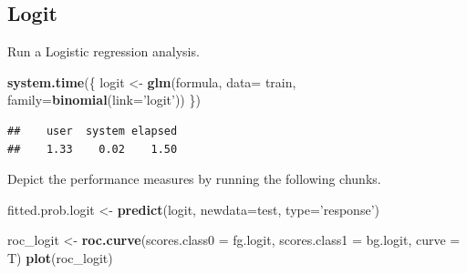 \documentclass[]{article}
\newenvironment{Shaded}{\begin{snugshade}}{\end{snugshade}}
\newcommand{\DataTypeTok}[1]{\textcolor[rgb]{0.13,0.29,0.53}{#1}}
\newcommand{\DecValTok}[1]{\textcolor[rgb]{0.00,0.00,0.81}{#1}}
\newcommand{\KeywordTok}[1]{\textcolor[rgb]{0.13,0.29,0.53}{\textbf{#1}}}
\newcommand{\NormalTok}[1]{#1}
\newcommand{\OperatorTok}[1]{\textcolor[rgb]{0.81,0.36,0.00}{\textbf{#1}}}
\newcommand{\StringTok}[1]{\textcolor[rgb]{0.31,0.60,0.02}{#1}}
\begin{document}
\hypertarget{logit}{%
\subsection{Logit}\label{logit}}

Run a Logistic regression analysis.

\begin{Shaded}
\begin{Highlighting}[]
\KeywordTok{system.time}\NormalTok{(\{}
\NormalTok{logit <-}\StringTok{ }\KeywordTok{glm}\NormalTok{(formula, }\DataTypeTok{data=}\NormalTok{ train,}
             \DataTypeTok{family=}\KeywordTok{binomial}\NormalTok{(}\DataTypeTok{link=}\StringTok{'logit'}\NormalTok{))}
\NormalTok{\})}
\end{Highlighting}
\end{Shaded}

\begin{verbatim}
##    user  system elapsed 
##    1.33    0.02    1.50
\end{verbatim}

Depict the performance measures by running the following chunks.

\begin{Shaded}
\begin{Highlighting}[]
\NormalTok{fitted.prob.logit <-}\StringTok{ }\KeywordTok{predict}\NormalTok{(logit, }\DataTypeTok{newdata=}\NormalTok{test, }\DataTypeTok{type=}\StringTok{'response'}\NormalTok{)}
\end{Highlighting}
\end{Shaded}

\begin{Shaded}
\end{Shaded}

\begin{Shaded}
\begin{Highlighting}[]
\NormalTok{roc_logit <-}\StringTok{ }\KeywordTok{roc.curve}\NormalTok{(}\DataTypeTok{scores.class0 =}\NormalTok{ fg.logit,}
                       \DataTypeTok{scores.class1 =}\NormalTok{ bg.logit,}
                       \DataTypeTok{curve =}\NormalTok{ T)}
\KeywordTok{plot}\NormalTok{(roc_logit)}
\end{Highlighting}
\end{Shaded}
\end{document}

